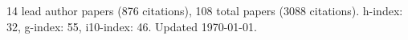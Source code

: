 14 lead author papers (876 citations),
108 total papers (3088 citations).\newline
h-index: 32, g-index: 55, i10-index: 46. Updated \today.